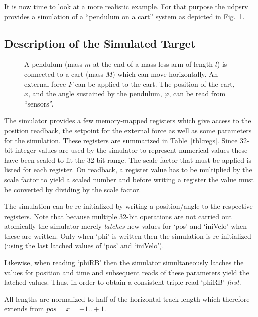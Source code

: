 \documentclass[10pt]{article}
\newcommand{\udps}      {udpsrv}
\newcounter{figs}
\newcommand{\fig}[2]{
\refstepcounter{figs}
\hspace*{\fill}\resizebox{#1}{!}{\texttt{[image: \#2]}}\hspace*{\fill}
}
\newcommand{\figr}[1]{Fig.~\ref{fig:#1}}
\begin{document}
It is now time to look at a more realistic example. For that purpose the \udps{}
provides a simulation of a ``pendulum on a cart'' system as depicted in \figr{geom}.

\subsection{Description of the Simulated Target}

\begin{figure}[ht]
\fig{0.5\textwidth}{O.Common/geom.pdf}
\label{fig:geom}
\caption{A pendulum (mass $m$ at the end of a mass-less arm of length $l$) is connected
to a cart (mass $M$) which can move horizontally. An external force $F$ can be applied
to the cart. The position of the cart, $x$, and the angle sustained by the pendulum,
$\varphi$, can be read from ``sensors''.}
\end{figure}

The simulator provides a few memory-mapped registers which give access to the
position readback, the setpoint for the external force as well as some parameters
for the simulation. These registers are summarized in Table~\ref{tbl:regs}.
Since 32-bit integer values are used by the simulator to represent numerical values
these have been scaled to fit the 32-bit range. The scale factor that must be applied
is listed for each register. On readback, a register value has to be multiplied
by the scale factor to yield a scaled number and before writing a register the
value must be converted by dividing by the scale factor.

The simulation can be re-initialized by writing a position/angle to the respective
registers. Note that because multiple 32-bit operations are not carried out atomically
the simulator merely {\em latches} new values for `pos' and `iniVelo' when these
are written. Only when `phi' is written then the simulation is re-initialized
(using the last latched values of `pos' and `iniVelo').

Likewise, when reading `phiRB' then the simulator simultaneously latches the
values for position and time and subsequent reads of these parameters yield the
latched values. Thus, in order to obtain a consistent triple read `phiRB' {\em first}.

All lengths are normalized to half of the horizontal track length which therefore
extends from $pos = x =-1..+1$.
\end{document}
